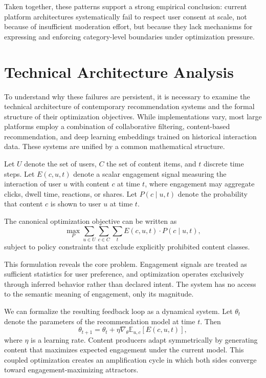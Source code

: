 \documentclass[11pt,oneside]{article}
\begin{document}
Taken together, these patterns support a strong empirical conclusion: current platform architectures systematically fail to respect user consent at scale, not because of insufficient moderation effort, but because they lack mechanisms for expressing and enforcing category-level boundaries under optimization pressure.

\section{Technical Architecture Analysis}

To understand why these failures are persistent, it is necessary to examine the technical architecture of contemporary recommendation systems and the formal structure of their optimization objectives. While implementations vary, most large platforms employ a combination of collaborative filtering, content-based recommendation, and deep learning embeddings trained on historical interaction data. These systems are unified by a common mathematical structure.

Let \( U \) denote the set of users, \( C \) the set of content items, and \( t \) discrete time steps. Let \( E(c,u,t) \) denote a scalar engagement signal measuring the interaction of user \( u \) with content \( c \) at time \( t \), where engagement may aggregate clicks, dwell time, reactions, or shares. Let \( P(c \mid u,t) \) denote the probability that content \( c \) is shown to user \( u \) at time \( t \).

The canonical optimization objective can be written as
\[
\max_{P} \sum_{u \in U} \sum_{c \in C} \sum_{t} E(c,u,t) \cdot P(c \mid u,t),
\]
subject to policy constraints that exclude explicitly prohibited content classes.

This formulation reveals the core problem. Engagement signals are treated as sufficient statistics for user preference, and optimization operates exclusively through inferred behavior rather than declared intent. The system has no access to the semantic meaning of engagement, only its magnitude.

We can formalize the resulting feedback loop as a dynamical system. Let \( \theta_t \) denote the parameters of the recommendation model at time \( t \). Then
\[
\theta_{t+1} = \theta_t + \eta \nabla_{\theta} \mathbb{E}_{u,c}[E(c,u,t)],
\]
where \( \eta \) is a learning rate. Content producers adapt symmetrically by generating content that maximizes expected engagement under the current model. This coupled optimization creates an amplification cycle in which both sides converge toward engagement-maximizing attractors.
\end{document}

